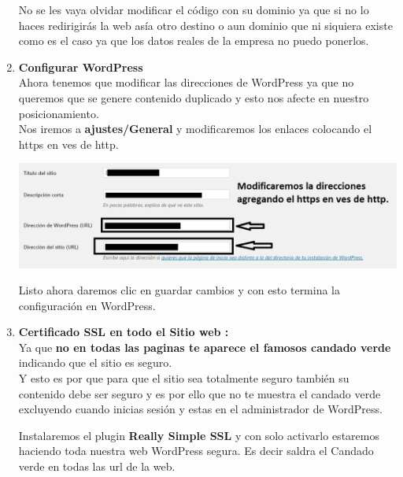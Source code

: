 \begin{enumerate}
		No se les vaya olvidar modificar el código con su dominio ya que si no lo haces redirigirás la web asía otro destino o aun dominio que ni siquiera existe como es el caso ya que los datos reales de la empresa no puedo ponerlos.\\
		
		\item \textbf{Configurar WordPress}\\
		
		Ahora tenemos que modificar las direcciones de WordPress ya que no queremos que se genere contenido duplicado y esto nos afecte en nuestro posicionamiento.\\
		
		Nos iremos a \textbf{ajustes/General} y modificaremos los enlaces colocando el https en ves de http.
		
		\begin{center}
		\includegraphics[scale=0.3]{image/image5.png}\\
		\end{center}
		
		Listo ahora daremos clic en guardar cambios y con esto termina la configuración en WordPress.\\
		
		\item \textbf{Certificado SSL en todo el Sitio web :}\\
		
		Ya que \textbf{no en todas las paginas te aparece el famosos candado verde} indicando que el sitio es seguro.\\
			
		Y esto es por que para que el sitio sea totalmente seguro también su contenido debe ser seguro y es por ello que no te muestra el candado verde excluyendo cuando inicias sesión y estas en el administrador de WordPress.
		
		\newpage
			
		Instalaremos el plugin \textbf{Really Simple SSL}  y con solo activarlo estaremos haciendo toda nuestra web WordPress segura. Es decir saldra el Candado verde en todas las url de la web.
		
		\end{enumerate}
	
